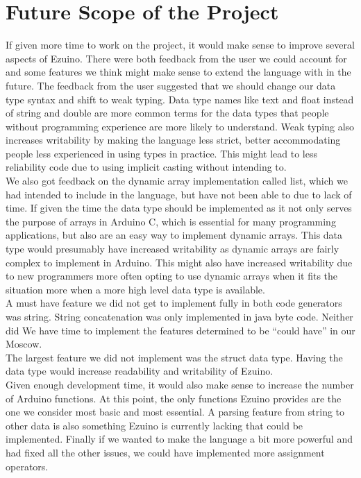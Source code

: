 \chapter{Future Scope of the Project}
If given more time to work on the project, it would make sense to improve several aspects of Ezuino. There were both feedback from the user we could account for and some features we think might make sense to extend the language with in the future.
The feedback from the user suggested that we should change our data type syntax and shift to weak typing. Data type names like text and float instead of string and double are more common terms for the data types that people without programming experience are more likely to understand. Weak typing also increases writability by making the language less strict, better accommodating people less experienced in using types in practice. This might lead to less reliability code due to using implicit casting without intending to. \\
We also got feedback on the dynamic array implementation called list, which we had intended to include in the language, but have not been able to due to lack of time. If given the time the data type should be implemented as it not only serves the purpose of arrays in Arduino C, which is essential for many programming applications, but also are an easy way to implement dynamic arrays. This data type would presumably have increased writability as dynamic arrays are fairly complex to implement in Arduino. This might also have increased writability due to new programmers more often opting to use dynamic arrays when it fits the situation more when a more high level data type is available. \\
A must have feature we did not get to implement fully in both code generators was string. String concatenation was only implemented in java byte code.
Neither did We have time to implement the features determined to be “could have” in our Moscow. \\
The largest feature we did not implement was the struct data type. Having the data type would increase readability and writability of Ezuino. \\
Given enough development time, it would also make sense to increase the number of Arduino functions. At this point, the only functions Ezuino provides are the one we consider most basic and most essential. A parsing feature from string to other data is also something Ezuino is currently lacking that could be implemented. Finally if we wanted to make the language a bit more powerful and had fixed all the other issues, we could have implemented more assignment operators.

